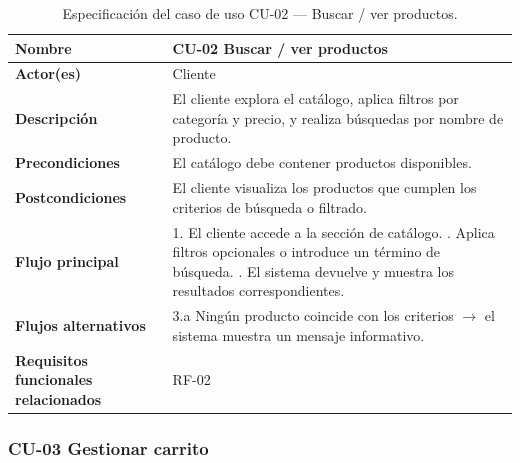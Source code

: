 \begin{table}[H]
\centering
\small
\begin{tabular}{|m{}|m{}|}
\hline
\textbf{Nombre} & CU-02 Buscar / ver productos \\ \hline
\textbf{Actor(es)} & Cliente \\ \hline
\textbf{Descripción} & El cliente explora el catálogo, aplica filtros por categoría y precio, y realiza búsquedas por nombre de producto. \\ \hline
\textbf{Precondiciones} & El catálogo debe contener productos disponibles. \\ \hline
\textbf{Postcondiciones} & El cliente visualiza los productos que cumplen los criterios de búsqueda o filtrado. \\ \hline
\textbf{Flujo principal} & 1. El cliente accede a la sección de catálogo. \newline 2. Aplica filtros opcionales o introduce un término de búsqueda. \newline 3. El sistema devuelve y muestra los resultados correspondientes. \\ \hline
\textbf{Flujos alternativos} & 3.a Ningún producto coincide con los criterios $\rightarrow$ el sistema muestra un mensaje informativo. \\ \hline
\textbf{Requisitos funcionales relacionados} & RF-02 \\ \hline
\end{tabular}
\caption{Especificación del caso de uso CU-02 — Buscar / ver productos.}
\end{table}

\subsubsection{CU-03 Gestionar carrito}

